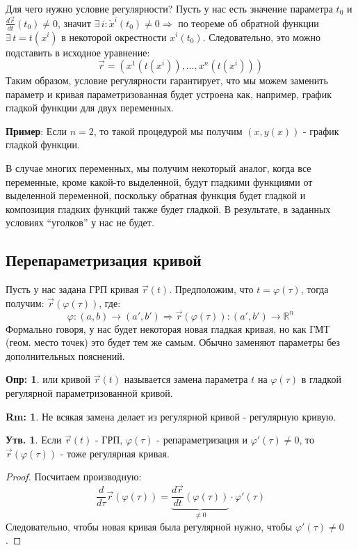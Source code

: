 \documentclass[12pt]{article}
\newcommand{\MR}{\mathbb{R}}
\theoremstyle{definition}
\newtheorem{defn}{Опр:}
\newtheorem{rem}{Rm:}
\newtheorem{prop}{Утв.}
\begin{document}
Для чего нужно условие регулярности? Пусть у нас есть значение параметра $t_0$ и $\tfrac{d\vec{r}}{dt}(t_0) \neq 0$, значит $\exists \, i \colon \dot{x}^i(t_0) \neq 0 \Rightarrow$ по теореме об обратной функции $\exists \, t = t(x^i)$ в некоторой окрестности $x^i(t_0)$. Следовательно, это можно подставить в исходное уравнение:
$$
	\vec{r} = (x^1(t(x^i)), \dotsc, x^n(t(x^i)))	
$$
Таким образом, условие регулярности гарантирует, что мы можем заменить параметр и кривая параметризованная будет устроена как, например, график гладкой функции для двух переменных. 

\textbf{Пример}: Если $n = 2$, то такой процедурой мы получим $(x, y(x))$ - график гладкой функции.

В случае многих переменных, мы получим некоторый аналог, когда все переменные, кроме какой-то выделенной, будут гладкими функциями от выделенной переменной, поскольку обратная функция будет гладкой и композиция гладких функций также будет гладкой. В результате, в заданных условиях ``уголков'' у нас не будет.

\subsection*{Перепараметризация кривой}
Пусть у нас задана ГРП кривая $\vec{r}(t)$. Предположим, что $t = \varphi(\tau)$, тогда получим: $\vec{r}(\varphi(\tau))$, где: 
$$
	\varphi \colon (a,b) \to (a',b') \Rightarrow \vec{r}(\varphi(\tau))\colon (a',b') \to \MR^n
$$ 
Формально говоря, у нас будет некоторая новая гладкая кривая, но как ГМТ (геом. место точек) это будет тем же самым. Обычно заменяют параметры без дополнительных пояснений. 
\begin{defn}
	 или  кривой $\vec{r}(t)$ называется замена параметра $t$ на $\varphi(\tau)$ в гладкой регулярной параметризованной кривой.
\end{defn}

\begin{rem}
	Не всякая замена делает из регулярной кривой - регулярную кривую.
\end{rem}

\begin{prop}
	Если $\vec{r}(t)$ - ГРП, $\varphi(\tau)$ - репараметризация и $\varphi'(\tau) \neq 0$, то $\vec{r}(\varphi(\tau))$ - тоже регулярная кривая.
\end{prop}
\begin{proof}
	Посчитаем производную:
	$$
		\dfrac{d}{d\tau}\vec{r}(\varphi(\tau)) = \underbrace{\dfrac{d\vec{r}}{d t}(\varphi(\tau))}_{\neq 0}{\cdot}\varphi'(\tau)
	$$
	Следовательно, чтобы новая кривая была регулярной нужно, чтобы $\varphi'(\tau) \neq 0$.
\end{proof}
\end{document}
